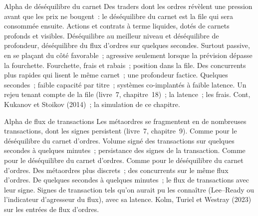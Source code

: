 \begin{strategyfile}{Alpha de déséquilibre du carnet}\label{strat:s1:intraday-machine-learned-alphas:book}
 Des traders dont les ordres révèlent une pression avant que les prix ne bougent~: le déséquilibre du carnet est la file qui sera consommée ensuite.
 Actions et contrats à terme liquides, dotés de carnets profonds et visibles.
 Déséquilibre au meilleur niveau et déséquilibre de profondeur, déséquilibre du flux d'ordres sur quelques secondes.
 Surtout passive, en se plaçant du côté favorable~; agressive seulement lorsque la prévision dépasse la fourchette.
 Fourchette, frais et rabais~; position dans la file.
 Des concurrents plus rapides qui lisent le même carnet~; une profondeur factice.
 Quelques secondes~; faible capacité par titre~; systèmes co-implantés à faible latence.
 Un rejeu tenant compte de la file (livre~7, chapitre~18)~; la latence~; les frais.
 Cont, Kukanov et Stoikov (2014)~; la simulation de ce chapitre.
\end{strategyfile}

\begin{strategyfile}{Alpha de flux de transactions}\label{strat:s1:intraday-machine-learned-alphas:flow}
 Les métaordres se fragmentent en de nombreuses transactions, dont les signes persistent (livre~7, chapitre~9).
 Comme pour le déséquilibre du carnet d'ordres.
 Volume signé des transactions sur quelques secondes à quelques minutes~; persistance des signes de la transaction.
 Comme pour le déséquilibre du carnet d'ordres.
 Comme pour le déséquilibre du carnet d'ordres.
 Des métaordres plus discrets~; des concurrents sur le même flux d'ordres.
 De quelques secondes à quelques minutes~; le flux de transactions avec leur signe.
 Signes de transaction tels qu'on aurait pu les connaître (Lee--Ready ou l'indicateur d'agresseur du flux), avec sa latence.
 Kolm, Turiel et Westray (2023) sur les entrées de flux d'ordres.
\end{strategyfile}

